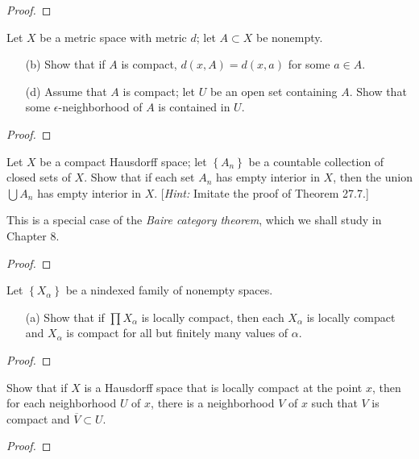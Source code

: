 \begin{proof}
\end{proof}
\newpage
\begin{problem}[Munkres \S27, Ex.\,2(b,d)]
Let $X$ be a metric space with metric $d$; let $A\subset X$ be
nonempty.
\begin{itemize}
\item[(b)] Show that if $A$ is compact, $d(x,A)=d(x,a)$ for some
  $a\in A$.
\item[(d)] Assume that $A$ is compact; let $U$ be an open set
  containing $A$. Show that some $\epsilon$-neighborhood of $A$
  is contained in $U$.
\end{itemize}
\end{problem}
\begin{proof}
\end{proof}
\newpage
\begin{problem}[Munkres \S27, Ex.\,5]
Let $X$ be a compact Hausdorff space; let $\left\{A_n\right\}$ be
a countable collection of closed sets of $X$. Show that if each
set $A_n$ has empty interior in $X$, then the union $\bigcup A_n$
has empty interior in $X$. [\emph{Hint:} Imitate the proof of
Theorem 27.7.]

This is a special case of the \emph{Baire category theorem},
which we shall study in Chapter 8.
\end{problem}
\begin{proof}
\end{proof}
\newpage
\begin{problem}[Munkres \S28, Ex.\,2(a)]
Let $\left\{X_\alpha\right\}$ be a nindexed family of nonempty
spaces.
\begin{itemize}
\item[(a)] Show that if $\prod X_\alpha$ is locally compact, then
  each $X_\alpha$ is locally compact and $X_\alpha$ is compact
  for all but finitely many values of $\alpha$.
\end{itemize}
\end{problem}
\begin{proof}
\end{proof}
\newpage
\begin{problem}[Munkres \S28, Ex.\,10]
Show that if $X$ is a Hausdorff space that is locally compact at
the point $x$, then for each neighborhood $U$ of $x$, there is a
neighborhood $V$ of $x$ such that $V$ is compact and $\overline
V\subset U$.
\end{problem}
\begin{proof}
\end{proof}
